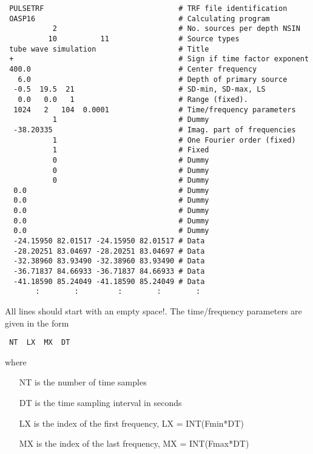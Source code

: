 \small
\begin{verbatim}
 PULSETRF                               # TRF file identification
 OASP16                                 # Calculating program
           2                            # No. sources per depth NSIN
          10          11                # Source types
 tube wave simulation                   # Title
 +                                      # Sign if time factor exponent
 400.0                                  # Center frequency 
   6.0                                  # Depth of primary source
  -0.5  19.5  21                        # SD-min, SD-max, LS
   0.0   0.0   1                        # Range (fixed).
  1024   2   104  0.0001                # Time/frequency parameters
           1                            # Dummy
  -38.20335                             # Imag. part of frequencies
           1                            # One Fourier order (fixed)
           1                            # Fixed
           0                            # Dummy
           0                            # Dummy
           0                            # Dummy
  0.0                                   # Dummy
  0.0                                   # Dummy
  0.0                                   # Dummy
  0.0                                   # Dummy
  0.0                                   # Dummy
  -24.15950 82.01517 -24.15950 82.01517 # Data
  -28.20251 83.04697 -28.20251 83.04697 # Data
  -32.38960 83.93490 -32.38960 83.93490 # Data
  -36.71837 84.66933 -36.71837 84.66933 # Data
  -41.18590 85.24049 -41.18590 85.24049 # Data
       :        :         :        :        :
\end{verbatim}
\normalsize

 All lines should start with an empty space!.
 The time/frequency parameters are given in the form

\small
\begin{verbatim}
 NT  LX  MX  DT
\end{verbatim}
\normalsize
\noindent where
\begin{itemize}
\item[NT] is the number of time samples
\item[DT] is the time sampling interval in seconds
\item[LX] is the index of the first frequency, LX = INT(Fmin*DT)
\item[MX] is the index of the last frequency, MX = INT(Fmax*DT)
\end{itemize}

